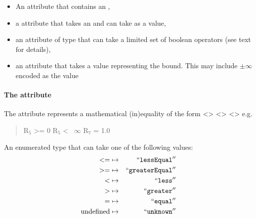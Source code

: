 \begin{itemize}
  \item An  attribute that contains an ,
  \item a  attribute that takes an  and can take \SBML \Reaction {} as a value,
  \item an  attribute of type  that can take a limited set of boolean operators (see text for details),
  \item {} an attribute that takes a  value representing the bound. This may include $\pm\infty$ encoded as the value 
\end{itemize}

\paragraph{The  attribute}
The  attribute represents a mathematical (in)equality of the form <> <> <> e.g.
 \begin{quote}\center
 R$_{5}$ >= 0\newline
 R$_{5}$ <~ $\infty$\newline
 R$_{7}$ = 1.0\newline
\end{quote}
An enumerated type that can take one of the following values:
\begin{eqnarray*}
\label{fb-operation-enum}
 \nonumber
  <= & \mapsto & ``\textcolor{black}{\textup{\ttfamily{lessEqual}}}''\\
  >= & \mapsto & ``\textcolor{black}{\textup{\ttfamily{greaterEqual}}}''\\
  < & \mapsto & ``\textcolor{black}{\textup{\ttfamily{less}}}''\\
  > & \mapsto & ``\textcolor{black}{\textup{\ttfamily{greater}}}''\\
  = & \mapsto & ``\textcolor{black}{\textup{\ttfamily{equal}}}''\\
  \textrm{undefined} & \mapsto & ``\textcolor{black}{\textup{\ttfamily{unknown}}}''
\end{eqnarray*}


